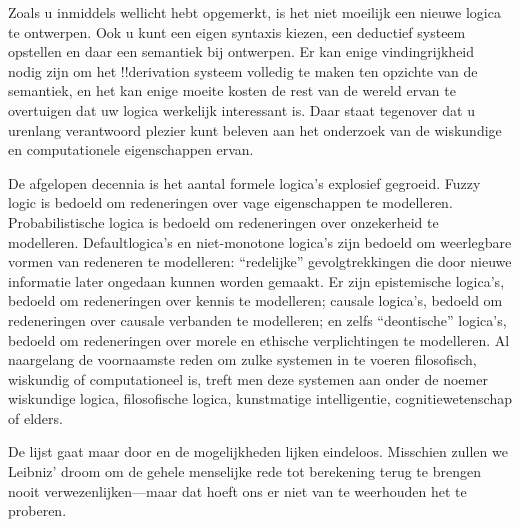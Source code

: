 \documentclass[../../../include/open-logic-section]{subfiles}
\begin{document}


Zoals u inmiddels wellicht hebt opgemerkt, is het niet moeilijk een nieuwe
logica te ontwerpen. Ook u kunt een eigen syntaxis kiezen, een deductief systeem
opstellen en daar een semantiek bij ontwerpen. Er kan enige vindingrijkheid
nodig zijn om het !!{derivation} systeem volledig te maken ten opzichte van de
semantiek, en het kan enige moeite kosten de rest van de wereld ervan te
overtuigen dat uw logica werkelijk interessant is. Daar staat tegenover dat u
urenlang verantwoord plezier kunt beleven aan het onderzoek van de wiskundige
en computationele eigenschappen ervan.

De afgelopen decennia is het aantal formele logica's explosief gegroeid. Fuzzy
logic is bedoeld om redeneringen over vage eigenschappen te modelleren.
Probabilistische logica is bedoeld om redeneringen over onzekerheid te
modelleren. Defaultlogica's en niet-monotone logica's zijn bedoeld om
weerlegbare vormen van redeneren te modelleren: ``redelijke'' gevolgtrekkingen
die door nieuwe informatie later ongedaan kunnen worden gemaakt. Er zijn
epistemische logica's, bedoeld om redeneringen over kennis te modelleren;
causale logica's, bedoeld om redeneringen over causale verbanden te modelleren;
en zelfs ``deontische'' logica's, bedoeld om redeneringen over morele en
ethische verplichtingen te modelleren. Al naargelang de voornaamste reden om
zulke systemen in te voeren filosofisch, wiskundig of computationeel is, treft
men deze systemen aan onder de noemer wiskundige logica, filosofische logica,
kunstmatige intelligentie, cognitiewetenschap of elders.

De lijst gaat maar door en de mogelijkheden lijken eindeloos. Misschien zullen
we Leibniz' droom om de gehele menselijke rede tot berekening terug te brengen
nooit verwezenlijken---maar dat hoeft ons er niet van te weerhouden het te
proberen.
\end{document}
